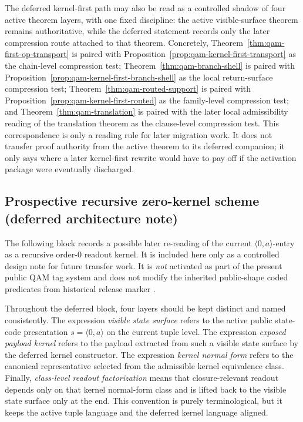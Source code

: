 \begin{remark}\label{rem:qam-zero-kernel-correspondence}
The deferred kernel-first path may also be read as a controlled shadow of four active theorem layers, with one fixed discipline: the active visible-surface theorem remains authoritative, while the deferred statement records only the later compression route attached to that theorem. Concretely, Theorem~\ref{thm:qam-first-op-transport} is paired with Proposition~\ref{prop:qam-kernel-first-transport} as the chain-level compression test; Theorem~\ref{thm:qam-branch-shell} is paired with Proposition~\ref{prop:qam-kernel-first-branch-shell} as the local return-surface compression test; Theorem~\ref{thm:qam-routed-support} is paired with Proposition~\ref{prop:qam-kernel-first-routed} as the family-level compression test; and Theorem~\ref{thm:qam-translation} is paired with the later local admissibility reading of the translation theorem as the clause-level compression test. This correspondence is only a reading rule for later migration work. It does not transfer proof authority from the active theorem to its deferred companion; it only says where a later kernel-first rewrite would have to pay off if the activation package were eventually discharged.
\end{remark}

\subsection*{Prospective recursive zero-kernel scheme (deferred architecture note)}

The following block records a possible later re-reading of the current $\langle 0,a\rangle$-entry as a recursive order-$0$ readout kernel. It is included here only as a controlled design note for future transfer work. It is \emph{not} activated as part of the present public QAM tag system and does not modify the inherited public-shape coded predicates from historical release marker .

\begin{remark}\label{rem:qam-zero-kernel-terminology}
Throughout the deferred block, four layers should be kept distinct and named consistently. The expression \emph{visible state surface} refers to the active public state-code presentation $s=\langle 0,a\rangle$ on the current tuple level. The expression \emph{exposed payload kernel} refers to the payload extracted from such a visible state surface by the deferred kernel constructor. The expression \emph{kernel normal form} refers to the canonical representative selected from the admissible kernel equivalence class. Finally, \emph{class-level readout factorization} means that closure-relevant readout depends only on that kernel normal-form class and is lifted back to the visible state surface only at the end. This convention is purely terminological, but it keeps the active tuple language and the deferred kernel language aligned.
\end{remark}

